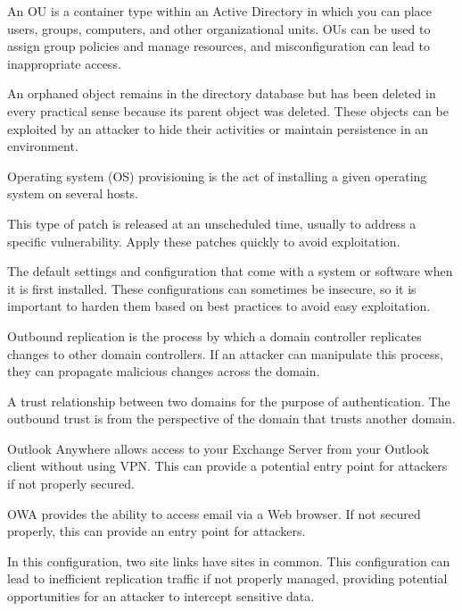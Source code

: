  An OU is a container type within an Active Directory in which you can place users, groups, computers, and other organizational units. OUs can be used to assign group policies and manage resources, and misconfiguration can lead to inappropriate access.

 An orphaned object remains in the directory database but has been deleted in every practical sense because its parent object was deleted. These objects can be exploited by an attacker to hide their activities or maintain persistence in an environment.

 Operating system (OS) provisioning is the act of installing a given operating system on several hosts. 

 This type of patch is released at an unscheduled time, usually to address a specific vulnerability. Apply these patches quickly to avoid exploitation.

 The default settings and configuration that come with a system or software when it is first installed. These configurations can sometimes be insecure, so it is important to harden them based on best practices to avoid easy exploitation.

 Outbound replication is the process by which a domain controller replicates changes to other domain controllers. If an attacker can manipulate this process, they can propagate malicious changes across the domain.

 A trust relationship between two domains for the purpose of authentication. The outbound trust is from the perspective of the domain that trusts another domain.

 Outlook Anywhere allows access to your Exchange Server from your Outlook client without using VPN. This can provide a potential entry point for attackers if not properly secured.

 OWA provides the ability to access email via a Web browser. If not secured properly, this can provide an entry point for attackers.

 In this configuration, two site links have sites in common. This configuration can lead to inefficient replication traffic if not properly managed, providing potential opportunities for an attacker to intercept sensitive data.

